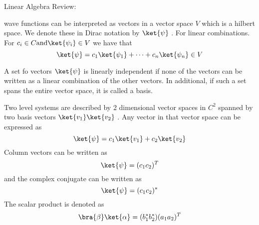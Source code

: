 \begin{remark}
  Linear Algebra Review:

  \begin{definition}
    wave functions can be interpreted as vectors in a vector space \(V\)  which
    is a hilbert space. We denote these in Dirac notation by \(\ket{\psi}\) . 
    For linear combinations. For \(c_i \in C \text{and} \ket{\psi_i} \in V\)  we have that 
    \[
      \ket{\psi } = c_1 \ket{\psi_1} + \dots + c_n \ket{\psi_n} \in V
    \]

    A set fo vectors \(\ket{\psi}\)  is linearly independent if none of the vectors can be written
    as a linear combination of the other vectors. In additional, if such a set spans the entire vector 
    space, it is called a basis. 
  \end{definition}

  \begin{definition}
    Two level systems are described by 2 dimensional vector spaces in \(C^2\) 
    spanned by two basis vectors \( \ket{v_1} \ket{v_2}\) . Any vector in that 
    vector space can be expressed as 
    \[
      \ket{\psi} = c_1 \ket{v_1} + c_2 \ket{v_2}
    \]
    Column vectors can be written as 
    \[
      \ket{\psi} = (c_1 c_2)^T
    \]
    and the complex conjugate can be written as 
    \[
      \ket{\psi} = (c_1 c_2)^{*}
    \]
    The scalar product is denoted as 
    \[
      \bra{\beta }\ket{\alpha } = (b_1^* b_2^*) (a_1 a_2)^T
    \]
  \end{definition}
\end{remark}